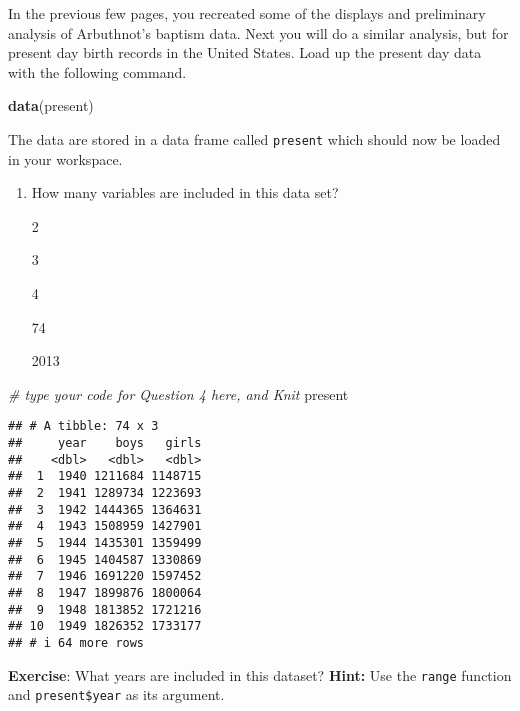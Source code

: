 \documentclass[
]{article}
\newenvironment{Shaded}{\begin{snugshade}}{\end{snugshade}}
\newcommand{\CommentTok}[1]{\textcolor[rgb]{0.56,0.35,0.01}{\textit{#1}}}
\newcommand{\FunctionTok}[1]{\textcolor[rgb]{0.13,0.29,0.53}{\textbf{#1}}}
\newcommand{\NormalTok}[1]{#1}
\newcommand{\SpecialCharTok}[1]{\textcolor[rgb]{0.81,0.36,0.00}{\textbf{#1}}}
\providecommand{\tightlist}{%
  \setlength{\itemsep}{0pt}\setlength{\parskip}{0pt}}
\begin{document}
In the previous few pages, you recreated some of the displays and
preliminary analysis of Arbuthnot's baptism data. Next you will do a
similar analysis, but for present day birth records in the United
States. Load up the present day data with the following command.

\begin{Shaded}
\begin{Highlighting}[]
\FunctionTok{data}\NormalTok{(present)}
\end{Highlighting}
\end{Shaded}

The data are stored in a data frame called \texttt{present} which should
now be loaded in your workspace.

\begin{enumerate}
\def\labelenumi{\arabic{enumi}.}
\setcounter{enumi}{3}
\tightlist
\item
  How many variables are included in this data set?

  2

  3

  4

  74

  2013
\end{enumerate}

\begin{Shaded}
\begin{Highlighting}[]
\CommentTok{\# type your code for Question 4 here, and Knit}
\NormalTok{present}
\end{Highlighting}
\end{Shaded}

\begin{verbatim}
## # A tibble: 74 x 3
##     year    boys   girls
##    <dbl>   <dbl>   <dbl>
##  1  1940 1211684 1148715
##  2  1941 1289734 1223693
##  3  1942 1444365 1364631
##  4  1943 1508959 1427901
##  5  1944 1435301 1359499
##  6  1945 1404587 1330869
##  7  1946 1691220 1597452
##  8  1947 1899876 1800064
##  9  1948 1813852 1721216
## 10  1949 1826352 1733177
## # i 64 more rows
\end{verbatim}

\label{exercise}
\textbf{Exercise}: What years are included in this dataset?
\textbf{Hint:} Use the \texttt{range} function and
\texttt{present\$year} as its argument.

\begin{Shaded}
\end{Shaded}
\end{document}

